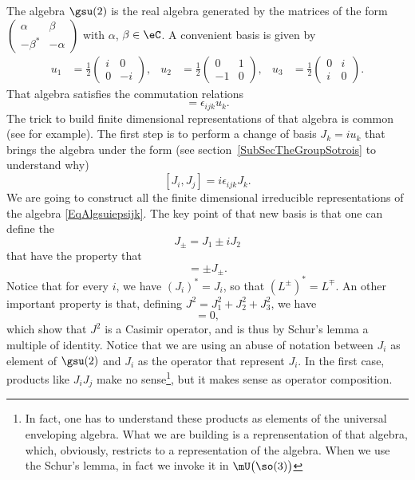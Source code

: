 The algebra $\gsu(2)$ is the real algebra generated by the matrices of the form
$
	\begin{pmatrix}
		\alpha   & \beta   \\
		-\beta^* & -\alpha
	\end{pmatrix}
$ with $\alpha$, $\beta\in\eC$. A convenient basis is given by
\begin{align}       \label{EqGenssudeux}
	u_1 & =\frac{ 1 }{2}
	\begin{pmatrix}
		i & 0  \\
		0 & -i
	\end{pmatrix},
	    & u_2            & =
	\frac{ 1 }{2}
	\begin{pmatrix}
		0  & 1 \\
		-1 & 0
	\end{pmatrix},
	    & u_3            & =\frac{ 1 }{2}
	\begin{pmatrix}
		0 & i \\
		i & 0
	\end{pmatrix}.
\end{align}
That algebra satisfies the commutation relations
\begin{equation}
	[u_i,u_j]=\epsilon_{ijk}u_k.
\end{equation}
The trick to build finite dimensional representations of that algebra is common (see \cite{MQSenechal} for example). The first step is to perform a change of basis $J_k=iu_k$ that brings the algebra under the form (see section~\ref{SubSecTheGroupSotrois} to understand why)
\begin{equation}        \label{EqAlgsuiepsijk}
	[J_i,J_j]=i\epsilon_{ijk}J_k.
\end{equation}
We are going to construct all the finite dimensional irreducible representations of the algebra \eqref{EqAlgsuiepsijk}. The key point of that new basis is that one can define the 
\begin{equation}
	J_{\pm}=J_1\pm iJ_2
\end{equation}
that have the property that
\begin{equation}
	[J_3,J_{\pm}]=\pm J_{\pm}.
\end{equation}
Notice that for every $i$, we have $(J_i)^*=J_i$, so that $(L^{\pm})^*=L^{\mp}$. An other important property is that, defining $J^2=J_1^2+J_2^2+J_3^2$, we have
\begin{equation}
	[J_i,J^2]=0,
\end{equation}
which show that $J^2$ is a Casimir operator, and is thus by Schur's lemma a multiple of identity. Notice that we are using an abuse of notation between $J_i$ as element of $\gsu(2)$ and $J_i$ as the operator that represent $J_i$. In the first case, products like $J_iJ_j$ make no sense\footnote{In fact, one has to understand these products as elements of the universal enveloping algebra. What we are building is a reprensentation of that algebra, which, obviously, restricts to a representation of the algebra. When we use the Schur's lemma, in fact we invoke it in $\mU\big(\so(3)\big)$}, but it makes sense as operator composition.

